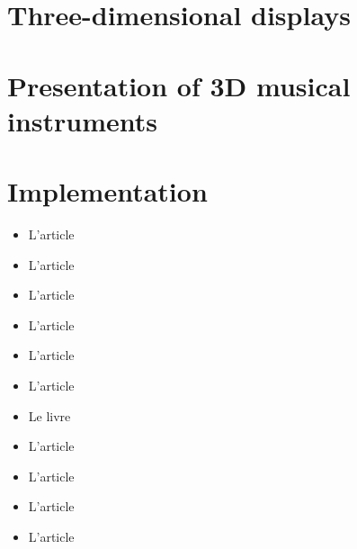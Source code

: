 \documentclass[a4paper,11pt,oneside]{report}
\title{
\begin{figure} [h!]
\begin{center}
\texttt{[image: image/LogoUniversiteBX1.jpg]}
\end{center}	
\end{figure}
\textbf{\large{Université of Bordeaux \\
		 2013-2014}			 	  		
\paragraph{}
\LARGE{Projet d'Étude et de Recherche}
\paragraph{}
\Huge{\textcolor{red}{Three-dimensional musical instrument}}}
\newline
\newline
 \large{\textbf{\textit{Supervisor:}} Aurélie \textsc{Bugeau}}\\
 \large{\textbf{\textit{Clients:}} Myriam \textsc{Desainte-Catherine}, Joseph
 \textsc{Larralde}, and Florent \textsc{Berthaut}}}
\author{\fcolorbox{gris25} {gris25} {\small{Mohamed \textsc{Bourara}, Jean \textsc{Bui-Quang}, Omar \textsc{Ourhi}, Jean-Michaël \textsc{Celerier}, Marie \textsc{Immacula Omiscar}
 and Damien \textsc{Clergeaud}}}}
\date{\fcolorbox{gris25} {gris25} {\today}}
\begin{document}
\maketitle
\vspace{5cm}

\tableofcontents
\listoffigures



\chapter{Three-dimensional displays}
\label{chap:3ddisp}
\chapter{Presentation of 3D musical instruments}



\chapter{Implementation}





\printglossaries

\newpage
\begin{itemize}

\item L'article \cite{holliman2011three} 
\item L'article \cite{pimenta2012comprehensive} 
\item L'article \cite{mehrabi2013making} 

\item L'article \cite{kim2012frontal} 

\item L'article \cite{cadoz1999musique} 

\item L'article \cite{berthaut2010piivert}
\item Le livre \cite{okoshi1976three}
\item L'article \cite{rodet2005study} 
\item L'article \cite{plumage2007} 
\item L'article \cite{maki2005} 
\item L'article \cite{wozniewski2006spatial}



\end{itemize}
\end{document}
